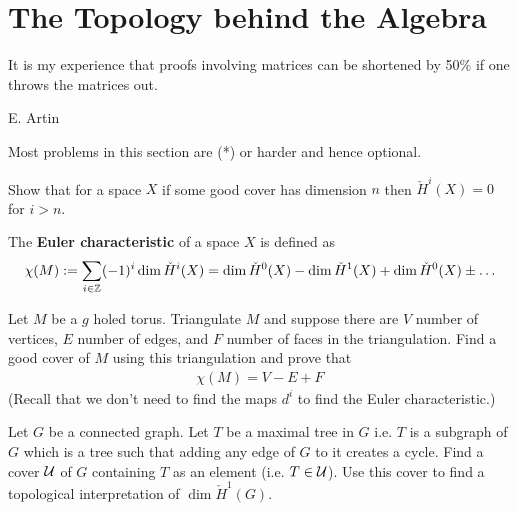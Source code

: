 
\section{The Topology behind the Algebra}
\epigraph{It is my experience that proofs involving matrices can be shortened by 50\% if one throws the matrices out.}{E. Artin}

 Most problems in this section are (*) or harder and hence optional.

\begin{ques}
  Show that for a space $X$ if some good cover has dimension $n$ then $\check H^i(X) = 0$ for $i > n$.
\end{ques}

\begin{definition}
  The {\bf Euler characteristic} of a space $X$ is defined as
  \begin{align*}
    \chi(M) := \sum \limits_{i \in \mathbb{Z}} (-1)^i \dim \check H^i(X)  = \dim \check H^0(X) - \dim \check H^1(X) + \dim \check H^0(X) \pm \dots
  \end{align*}
\end{definition}

\begin{ques}
  Let $M$ be a $g$ holed torus.
  Triangulate $M$ and suppose there are $V$ number of vertices, $E$ number of edges, and $F$ number of faces in the triangulation. Find a good cover of $M$ using this triangulation and prove that
  \begin{align*}
    \chi(M) = V - E + F
  \end{align*} (Recall that we don't need to find the maps $d^i$ to find the Euler characteristic.)
\end{ques}

\begin{ques}
Let $G$ be a connected graph. Let $T$ be a maximal tree in $G$ i.e. $T$ is a subgraph of $G$ which is a tree such that adding any edge of $G$ to it creates a cycle. Find a cover $\mathcal{U}$ of $G$ containing $T$ as an element (i.e. $T \in \mathcal{U}$). Use this cover to find a topological interpretation of $\dim \check H^1(G)$.
\end{ques}


